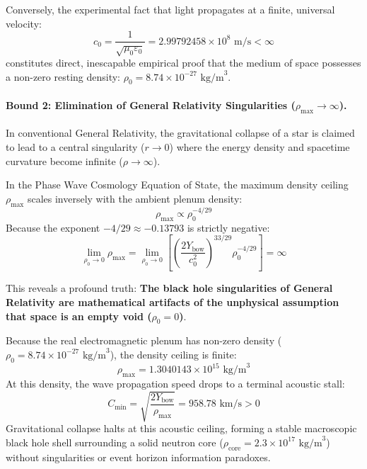 \documentclass[11pt,a4paper]{article}
\begin{document}
Conversely, the experimental fact that light propagates at a finite, universal velocity:
\begin{equation}
c_0 = \frac{1}{\sqrt{\mu_0\varepsilon_0}} = 2.99792458 \times 10^8\text{ m/s} < \infty
\end{equation}
constitutes direct, inescapable empirical proof that the medium of space possesses a non-zero resting density: $\rho_0 = 8.74 \times 10^{-27}\text{ kg/m}^3$.

\paragraph{Bound 2: Elimination of General Relativity Singularities ($\rho_{\max} \to \infty$).}
In conventional General Relativity, the gravitational collapse of a star is claimed to lead to a central singularity ($r \to 0$) where the energy density and spacetime curvature become infinite ($\rho \to \infty$).

In the Phase Wave Cosmology Equation of State, the maximum density ceiling $\rho_{\max}$ scales inversely with the ambient plenum density:
\begin{equation}
\rho_{\max} \propto \rho_0^{-4/29}
\end{equation}
Because the exponent $-4/29 \approx -0.13793$ is strictly negative:
\begin{equation}
\lim_{\rho_0 \to 0} \rho_{\max} = \lim_{\rho_0 \to 0} \left[ \left( \frac{2 Y_{\text{bow}}}{c_0^2} \right)^{33/29} \rho_0^{-4/29} \right] = \infty
\label{eq:singularity_void_artifact}
\end{equation}

This reveals a profound truth: \textbf{The black hole singularities of General Relativity are mathematical artifacts of the unphysical assumption that space is an empty void ($\rho_0 = 0$)}.

Because the real electromagnetic plenum has non-zero density ($\rho_0 = 8.74 \times 10^{-27}\text{ kg/m}^3$), the density ceiling is finite:
\begin{equation}
\rho_{\max} = 1.3040143 \times 10^{15}\text{ kg/m}^3
\end{equation}
At this density, the wave propagation speed drops to a terminal acoustic stall:
\begin{equation}
C_{\min} = \sqrt{\frac{2 Y_{\text{bow}}}{\rho_{\max}}} = 958.78\text{ km/s} > 0
\end{equation}
Gravitational collapse halts at this acoustic ceiling, forming a stable macroscopic black hole shell surrounding a solid neutron core ($\rho_{\text{core}} = 2.3 \times 10^{17}\text{ kg/m}^3$) without singularities or event horizon information paradoxes.
\end{document}
